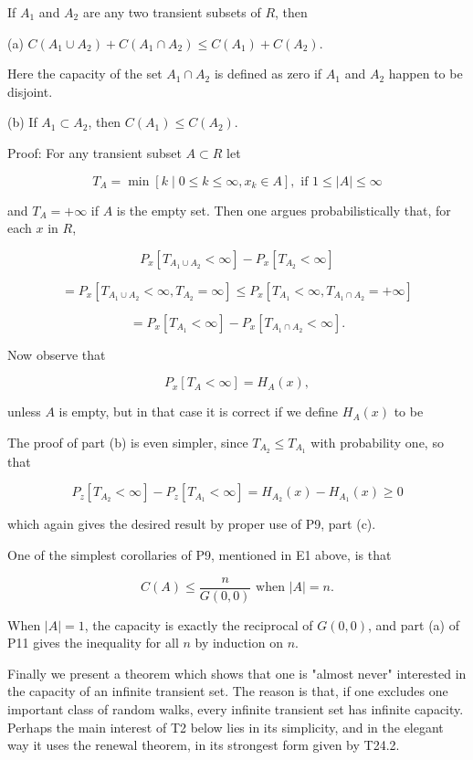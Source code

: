 If $A_1$ and $A_2$ are any two transient subsets of $R$, then

(a) $C(A_1 \cup A_2) + C(A_1 \cap A_2) \leq C(A_1) + C(A_2)$.

Here the capacity of the set $A_1 \cap A_2$ is defined as zero if $A_1$ and $A_2$ happen to be disjoint.

(b) If $A_1 \subset A_2$, then $C(A_1) \leq C(A_2)$.

Proof: For any transient subset $A \subset R$ let

$$T_A = \min [k \mid 0 \leq k \leq \infty, x_k \in A], \text{ if } 1 \leq |A| \leq \infty$$

and $T_A = +\infty$ if $A$ is the empty set. Then one argues probabilistically that, for each $x$ in $R$,

$$P_x[T_{A_1 \cup A_2} < \infty] - P_x[T_{A_2} < \infty]$$

$$= P_x[T_{A_1 \cup A_2} < \infty, T_{A_2} = \infty] \leq P_x[T_{A_1} < \infty, T_{A_1 \cap A_2} = +\infty]$$

$$= P_x[T_{A_1} < \infty] - P_x[T_{A_1 \cap A_2} < \infty].$$

Now observe that

$$P_x[T_A < \infty] = H_A(x),$$

unless $A$ is empty, but in that case it is correct if we define $H_A(x)$ to be

The proof of part (b) is even simpler, since $T_{A_2} \leq T_{A_1}$ with probability one, so that

$$P_z[T_{A_2} < \infty] - P_z[T_{A_1} < \infty] = H_{A_2}(x) - H_{A_1}(x) \geq 0$$

which again gives the desired result by proper use of P9, part (c).

One of the simplest corollaries of P9, mentioned in E1 above, is that

$$C(A) \leq \frac{n}{G(0,0)} \text{ when } |A| = n.$$

When $|A| = 1$, the capacity is exactly the reciprocal of $G(0,0)$, and part (a) of P11 gives the inequality for all $n$ by induction on $n$.

Finally we present a theorem which shows that one is "almost never" interested in the capacity of an infinite transient set. The reason is that, if one excludes one important class of random walks, every infinite transient set has infinite capacity. Perhaps the main interest of T2 below lies in its simplicity, and in the elegant way it uses the renewal theorem, in its strongest form given by T24.2.